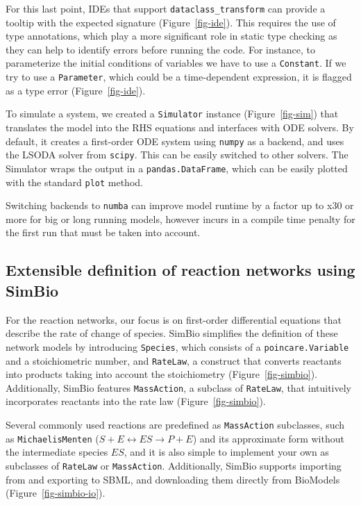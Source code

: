 \documentclass{article}
\begin{document}


For this last point,
\acp{IDE} that support \texttt{dataclass\_transform} \cite{debontePEP681Data2021}
can provide a tooltip with the expected signature (Figure~\ref{fig-ide}).
This requires the use of type annotations,
which play a more significant role in static type checking
as they can help to identify errors before running the code.
For instance, to parameterize the initial conditions of variables
we have to use a \texttt{Constant}.
If we try to use a \texttt{Parameter},
which could be a time-dependent expression,
it is flagged as a type error (Figure~\ref{fig-ide}).

To simulate a system,
we created a \texttt{Simulator} instance (Figure~\ref{fig-sim})
that translates the model into the \ac{RHS} equations
and interfaces with \ac{ODE} solvers.
By default,
it creates a first-order \ac{ODE} system using \texttt{numpy} as a backend,
and uses the LSODA solver from \texttt{scipy}.
This can be easily switched to other solvers.
The Simulator wraps the output in a \texttt{pandas.DataFrame},
which can be easily plotted with the standard \texttt{plot} method.

Switching backends to \texttt{numba} can improve model runtime by a factor up to x30 or more for big or long running models,
however incurs in a compile time penalty for the first run that must be taken into account.

\hypertarget{extensible-definition-of-reaction-networks-using-simbio}{%
\subsection{Extensible definition of reaction networks using
SimBio}\label{extensible-definition-of-reaction-networks-using-simbio}}

For the reaction networks, our focus is on first-order differential
equations that describe the rate of change of species. SimBio simplifies
the definition of these network models by introducing \texttt{Species},
which consists of a \texttt{poincare.Variable} and a stoichiometric
number, and \texttt{RateLaw}, a construct that converts reactants into
products taking into account the stoichiometry
(Figure~\ref{fig-simbio}). Additionally, SimBio features
\texttt{MassAction}, a subclass of \texttt{RateLaw}, that intuitively
incorporates reactants into the rate law (Figure~\ref{fig-simbio}).

Several commonly used reactions are predefined as \texttt{MassAction}
subclasses, such as \texttt{MichaelisMenten}
(\(S + E \leftrightarrow ES \rightarrow P + E\)) and its approximate
form without the intermediate species \(ES\), and it is also simple to
implement your own as subclasses of \texttt{RateLaw} or
\texttt{MassAction}. Additionally, SimBio supports importing from and
exporting to \ac{SBML}, and downloading them directly from BioModels
\cite{malik-sheriffBioModels15Years2020} (Figure~\ref{fig-simbio-io}).
\end{document}
